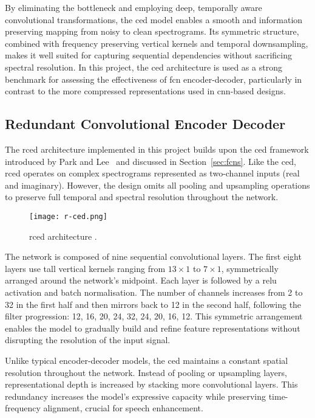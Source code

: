 By eliminating the bottleneck and employing deep, temporally aware convolutional transformations, the \gls{ced} model enables a smooth and information preserving mapping from noisy to clean spectrograms. Its symmetric structure, combined with frequency preserving vertical kernels and temporal downsampling, makes it well suited for capturing sequential dependencies without sacrificing spectral resolution. In this project, the \gls{ced} architecture is used as a strong benchmark for assessing the effectiveness of \gls{fcn} encoder-decoder, particularly in contrast to the more compressed representations used in \gls{cnn}-based designs.

\subsection{Redundant Convolutional Encoder Decoder}
\label{sec:rced}

The \gls{rced} architecture implemented in this project builds upon the \gls{ced} framework introduced by Park and Lee~\cite{park2017acoustic} and discussed in Section~\ref{sec:fcns}. Like the \gls{ced}, \gls{rced} operates on complex spectrograms represented as two-channel inputs (real and imaginary). However, the design omits all pooling and upsampling operations to preserve full temporal and spectral resolution throughout the network.

\begin{figure}[h]
    \centering
    \texttt{[image: r-ced.png]}
    \caption{\label{fig:rced}\gls{rced} architecture \cite{park2017acoustic}.}
\end{figure}

The network is composed of nine sequential convolutional layers. The first eight layers use tall vertical kernels ranging from \(13 \times 1\) to \(7 \times 1\), symmetrically arranged around the network's midpoint. Each layer is followed by a \gls{relu} activation and batch normalisation. The number of channels increases from 2 to 32 in the first half and then mirrors back to 12 in the second half, following the filter progression: 12, 16, 20, 24, 32, 24, 20, 16, 12. This symmetric arrangement enables the model to gradually build and refine feature representations without disrupting the resolution of the input signal.

Unlike typical encoder-decoder models, the \gls{ced} maintains a constant spatial resolution throughout the network. Instead of pooling or upsampling layers, representational depth is increased by stacking more convolutional layers. This redundancy increases the model’s expressive capacity while preserving time-frequency alignment, crucial for speech enhancement.

